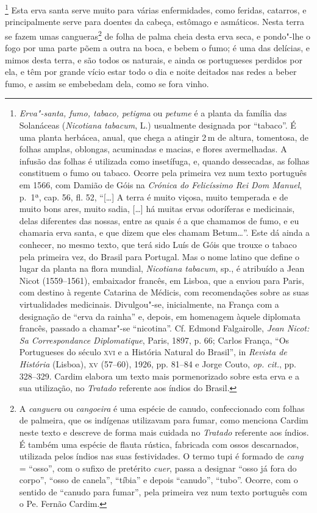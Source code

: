 \begin{linenumbers}
\footnote{ \textit{Erva"-santa, fumo, tabaco,
petigma} ou \textit{petume} é a planta da família das Solanáceas
(\textit{Nicotiana tabacum}, L.) usualmente designada por ``tabaco''. É
uma planta herbácea, anual, que chega a atingir 2\,m de altura,
tomentosa, de folhas amplas, oblongas, acuminadas e macias, e flores
avermelhadas. A infusão das folhas é utilizada como insetífuga, e,
quando dessecadas, as folhas constituem o fumo ou tabaco. Ocorre pela
primeira vez num texto português em 1566, com Damião de Góis na
\textit{Crónica do Felicíssimo Rei Dom Manuel}, p.~1ª, cap. 56, fl. 52,
``[\ldots{}] A terra é muito viçosa, muito temperada e de muito bons ares,
muito sadia, [\ldots{}] há muitas ervas odoríferas e medicinais, delas
diferentes das nossas, entre as quais é a que chamamos de fumo, e eu
chamaria erva santa, e que dizem que eles chamam Betum\ldots{}''. Este dá
ainda a conhecer, no mesmo texto, que terá sido Luís de Góis que
trouxe o tabaco pela primeira vez, do Brasil para Portugal. Mas o
nome latino que define o lugar da planta na flora mundial,
\textit{Nicotiana tabacum}, sp., é atribuído a Jean Nicot (1559--1561), 
embaixador francês, em Lisboa, que a enviou para Paris, com destino à
regente Catarina de Médicis, com recomendações sobre as suas
virtualidades medicinais. Divulgou"-se, inicialmente, na França com a
designação de ``erva da rainha'' e, depois, em homenagem àquele diplomata
francês, passado a chamar"-se ``nicotina''. Cf. Edmond Falgairolle,
\textit{Jean Nicot: Sa Correspondance Diplomatique}, Paris, 1897, p.
66; Carlos França, ``Os Portugueses do século \textsc{xvi} e a História Natural
do Brasil'', in \textit{Revista de História} (Lisboa), \textsc{xv} (57--60),
1926, pp. 81--84 e Jorge Couto, \textit{op. cit.}, pp. 328--329. Cardim
elabora um texto mais pormenorizado sobre esta erva e a sua utilização,
no \textit{Tratado} referente aos índios do Brasil.} Esta
erva santa serve muito para várias enfermidades, como feridas,
catarros, e principalmente serve para doentes da cabeça, estômago e
asmáticos. Nesta terra se fazem umas cangueras\footnote{ A
\textit{canguera} ou \textit{cangoeira} é uma espécie de canudo,
confeccionado com folhas de palmeira, que os indígenas utilizavam para
fumar, como menciona Cardim neste texto e descreve de forma mais
cuidada no \textit{Tratado} referente aos índios. É também uma espécie
de flauta rústica, fabricada com ossos descarnados, utilizada pelos
índios nas suas festividades. O termo tupi é formado de \textit{cang} =
``osso'', com o sufixo de pretérito \textit{cuer}, passa a designar ``osso
já fora do corpo'', ``osso de canela'', ``tíbia'' e depois ``canudo'', ``tubo''.
Ocorre, com o sentido de ``canudo para fumar'', pela primeira vez num
texto português com o Pe. Fernão Cardim.} de folha de palma cheia desta
erva seca, e pondo"-lhe o fogo por uma parte põem a outra na boca, e
bebem o fumo; é uma das delícias, e mimos desta terra, e são todos os
naturais, e ainda os portugueses perdidos por ela, e têm por grande
vício estar todo o dia e noite deitados nas redes a beber fumo, e assim
se embebedam dela, como se fora vinho. 


\end{linenumbers}

